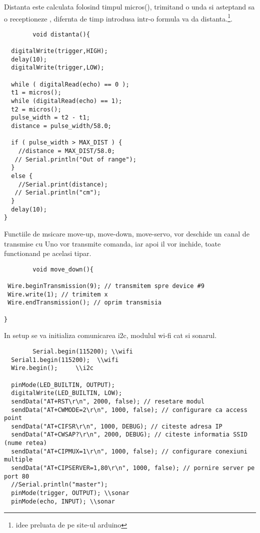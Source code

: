 \begin{itemize}
	\tab Distanta este calculata folosind timpul micros(), trimitand o unda si asteptand sa o receptioneze , difernta de timp introdusa intr-o formula va da distanta.\footnote{idee preluata de pe site-ul arduino}.
	\begin{verbatim}
		void distanta(){
 
  digitalWrite(trigger,HIGH);
  delay(10);
  digitalWrite(trigger,LOW);
 
  while ( digitalRead(echo) == 0 );
  t1 = micros();
  while (digitalRead(echo) == 1);
  t2 = micros();
  pulse_width = t2 - t1;
  distance = pulse_width/58.0;
 
  if ( pulse_width > MAX_DIST ) {
    //distance = MAX_DIST/58.0;
   // Serial.println("Out of range");
  }
  else {
    //Serial.print(distance);
   // Serial.println("cm");
  }
  delay(10);
}
	\end{verbatim}

	\tab Functiile de msicare move-up, move-down, move-servo, vor deschide un canal de transmise cu Uno vor transmite comanda, iar apoi il vor inchide, toate functionand pe acelasi tipar.\\

	\begin{verbatim}
		void move_down(){
 
 Wire.beginTransmission(9); // transmitem spre device #9
 Wire.write(1); // trimitem x
 Wire.endTransmission(); // oprim transmisia

}
	\end{verbatim}

	\tab In setup se va initializa comunicarea i2c, modulul wi-fi cat si sonarul.\\

	\begin{verbatim}
		Serial.begin(115200); \\wifi
  Serial1.begin(115200);  \\wifi
  Wire.begin(); 	\\i2c
 
  pinMode(LED_BUILTIN, OUTPUT); 
  digitalWrite(LED_BUILTIN, LOW); 
  sendData("AT+RST\r\n", 2000, false); // resetare modul 
  sendData("AT+CWMODE=2\r\n", 1000, false); // configurare ca access point 
  sendData("AT+CIFSR\r\n", 1000, DEBUG); // citeste adresa IP 
  sendData("AT+CWSAP?\r\n", 2000, DEBUG); // citeste informatia SSID (nume retea) 
  sendData("AT+CIPMUX=1\r\n", 1000, false); // configurare conexiuni multiple 
  sendData("AT+CIPSERVER=1,80\r\n", 1000, false); // pornire server pe port 80 
  //Serial.println("master");
  pinMode(trigger, OUTPUT); \\sonar
  pinMode(echo, INPUT); \\sonar
	\end{verbatim}


\end{itemize}
